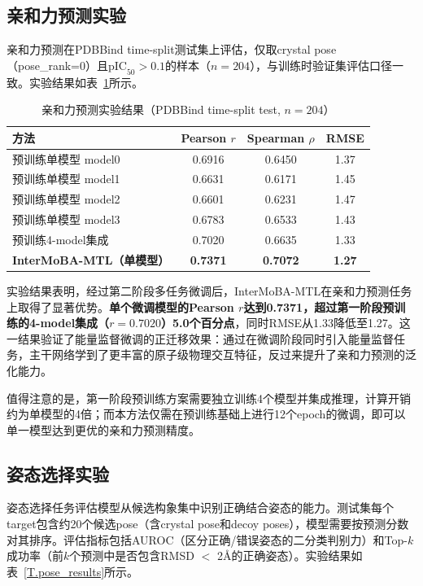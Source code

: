 \subsection{亲和力预测实验}

亲和力预测在PDBBind time-split测试集上评估，仅取crystal pose（pose\_rank=0）且$\text{pIC}_{50} > 0.1$的样本（$n = 204$），与训练时验证集评估口径一致。实验结果如表~\ref{T.affinity_results}所示。

\begin{table}[htb]
  \centering
  \caption{亲和力预测实验结果（PDBBind time-split test, $n=204$）}
  \label{T.affinity_results}
  \begin{tabular}{lccc}
  \hline
  方法 & Pearson $r$ & Spearman $\rho$ & RMSE \\
  \hline
  预训练单模型 model0 & 0.6916 & 0.6450 & 1.37 \\
  预训练单模型 model1 & 0.6631 & 0.6171 & 1.45 \\
  预训练单模型 model2 & 0.6601 & 0.6231 & 1.47 \\
  预训练单模型 model3 & 0.6783 & 0.6533 & 1.43 \\
  预训练4-model集成 & 0.7020 & 0.6635 & 1.33 \\
  \textbf{InterMoBA-MTL（单模型）} & \textbf{0.7371} & \textbf{0.7072} & \textbf{1.27} \\
  \hline
\end{tabular}
\end{table}

实验结果表明，经过第二阶段多任务微调后，InterMoBA-MTL在亲和力预测任务上取得了显著优势。\textbf{单个微调模型的Pearson $r$达到0.7371，超过第一阶段预训练的4-model集成（$r=0.7020$）5.0个百分点}，同时RMSE从1.33降低至1.27。这一结果验证了能量监督微调的正迁移效果：通过在微调阶段同时引入能量监督任务，主干网络学到了更丰富的原子级物理交互特征，反过来提升了亲和力预测的泛化能力。

值得注意的是，第一阶段预训练方案需要独立训练4个模型并集成推理，计算开销约为单模型的4倍；而本方法仅需在预训练基础上进行12个epoch的微调，即可以单一模型达到更优的亲和力预测精度。

\subsection{姿态选择实验}

姿态选择任务评估模型从候选构象集中识别正确结合姿态的能力。测试集每个target包含约20个候选pose（含crystal pose和decoy poses），模型需要按预测分数对其排序。评估指标包括AUROC（区分正确/错误姿态的二分类判别力）和Top-$k$成功率（前$k$个预测中是否包含RMSD $<$ 2\AA 的正确姿态）。实验结果如表~\ref{T.pose_results}所示。

